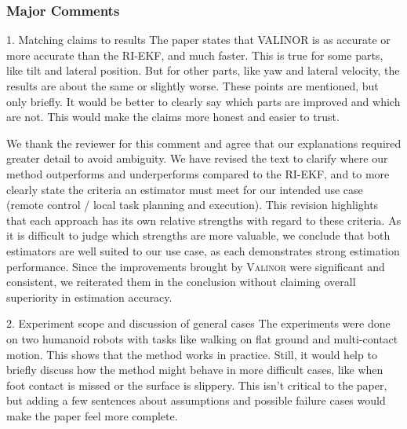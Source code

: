 \subsubsection{Major Comments}

\begin{revquote}
1. Matching claims to results
The paper states that VALINOR is as accurate or more accurate than the RI-EKF, and much faster. This is true for some parts, like tilt and lateral position. But for other parts, like yaw and lateral velocity, the results are about the same or slightly worse. These points are mentioned, but only briefly. It would be better to clearly say which parts are improved and which are not. This would make the claims more honest and easier to trust.
\end{revquote}

We thank the reviewer for this comment and agree that our explanations required greater detail to avoid ambiguity. We have revised the text to clarify where our method outperforms and underperforms compared to the RI-EKF, and to more clearly state the criteria an estimator must meet for our intended use case (remote control / local task planning and execution). This revision highlights that each approach has its own relative strengths with regard to these criteria. As it is difficult to judge which strengths are more valuable, we conclude that both estimators are well suited to our use case, as each demonstrates strong estimation performance. Since the improvements brought by {\scshape Valinor} were significant and consistent, we reiterated them in the conclusion without claiming overall superiority in estimation accuracy.

\begin{revquote}
2. Experiment scope and discussion of general cases
The experiments were done on two humanoid robots with tasks like walking on flat ground and multi-contact motion. This shows that the method works in practice. Still, it would help to briefly discuss how the method might behave in more difficult cases, like when foot contact is missed or the surface is slippery. This isn't critical to the paper, but adding a few sentences about assumptions and possible failure cases would make the paper feel more complete.
\end{revquote}

